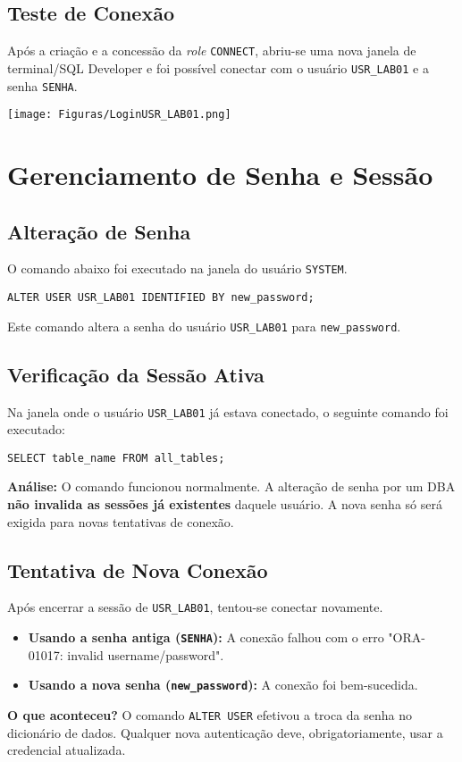 \documentclass[a4paper, 12pt]{article}
\begin{document}
\subsection{Teste de Conexão}
Após a criação e a concessão da \textit{role} \texttt{CONNECT}, abriu-se uma nova janela de terminal/SQL Developer e foi possível conectar com o usuário \texttt{USR\_LAB01} e a senha \texttt{SENHA}.
\begin{center}
	\texttt{[image: Figuras/LoginUSR\_LAB01.png]}
\end{center}

\section{Gerenciamento de Senha e Sessão}

\subsection{Alteração de Senha}
O comando abaixo foi executado na janela do usuário \texttt{SYSTEM}.
\begin{lstlisting}
ALTER USER USR_LAB01 IDENTIFIED BY new_password;
\end{lstlisting}
Este comando altera a senha do usuário \texttt{USR\_LAB01} para \texttt{new\_password}.

\subsection{Verificação da Sessão Ativa}
Na janela onde o usuário \texttt{USR\_LAB01} já estava conectado, o seguinte comando foi executado:
\begin{lstlisting}
SELECT table_name FROM all_tables;
\end{lstlisting}
\textbf{Análise:} O comando funcionou normalmente. A alteração de senha por um DBA \textbf{não invalida as sessões já existentes} daquele usuário. A nova senha só será exigida para novas tentativas de conexão.

\subsection{Tentativa de Nova Conexão}
Após encerrar a sessão de \texttt{USR\_LAB01}, tentou-se conectar novamente.
\begin{itemize}
	\item \textbf{Usando a senha antiga (\texttt{SENHA}):} A conexão falhou com o erro "ORA-01017: invalid username/password".
	\item \textbf{Usando a nova senha (\texttt{new\_password}):} A conexão foi bem-sucedida.
\end{itemize}
\textbf{O que aconteceu?} O comando \texttt{ALTER USER} efetivou a troca da senha no dicionário de dados. Qualquer nova autenticação deve, obrigatoriamente, usar a credencial atualizada.
\end{document}
